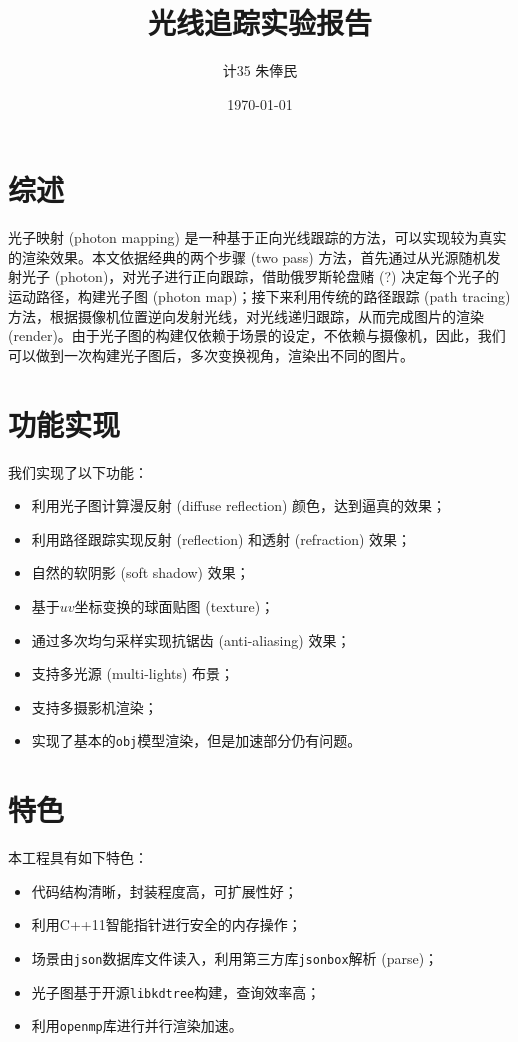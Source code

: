 \documentclass[11pt, a4paper]{article}
\title{\hei 光线追踪实验报告}
\author{\kai \quad 计35 \quad 朱俸民 \quad 2012011894}
\date{\kai \today}
\begin{document}
\maketitle

\section{综述}

光子映射 (photon mapping) 是一种基于正向光线跟踪的方法，可以实现较为真实的渲染效果。本文依据经典的两个步骤 (two pass) 方法，首先通过从光源随机发射光子 (photon)，对光子进行正向跟踪，借助俄罗斯轮盘赌 (?) 决定每个光子的运动路径，构建光子图 (photon map)；接下来利用传统的路径跟踪 (path tracing) 方法，根据摄像机位置逆向发射光线，对光线递归跟踪，从而完成图片的渲染 (render)。由于光子图的构建仅依赖于场景的设定，不依赖与摄像机，因此，我们可以做到一次构建光子图后，多次变换视角，渲染出不同的图片。

\section{功能实现}

我们实现了以下功能：

\begin{itemize}
    \item 利用光子图计算漫反射 (diffuse reflection) 颜色，达到逼真的效果；
    \item 利用路径跟踪实现反射 (reflection) 和透射 (refraction) 效果；
    \item 自然的软阴影 (soft shadow) 效果；
    \item 基于$uv$坐标变换的球面贴图 (texture)；
    \item 通过多次均匀采样实现抗锯齿 (anti-aliasing) 效果；
    \item 支持多光源 (multi-lights) 布景；
    \item 支持多摄影机渲染；
    \item 实现了基本的\texttt{obj}模型渲染，但是加速部分仍有问题。
\end{itemize}

\section{特色}

本工程具有如下特色：

\begin{itemize}
    \item 代码结构清晰，封装程度高，可扩展性好；
    \item 利用C++11智能指针进行安全的内存操作；
    \item 场景由\texttt{json}数据库文件读入，利用第三方库\texttt{jsonbox}解析 (parse)；
    \item 光子图基于开源\texttt{libkdtree}构建，查询效率高；
    \item 利用\texttt{openmp}库进行并行渲染加速。
\end{itemize}
\end{document}
